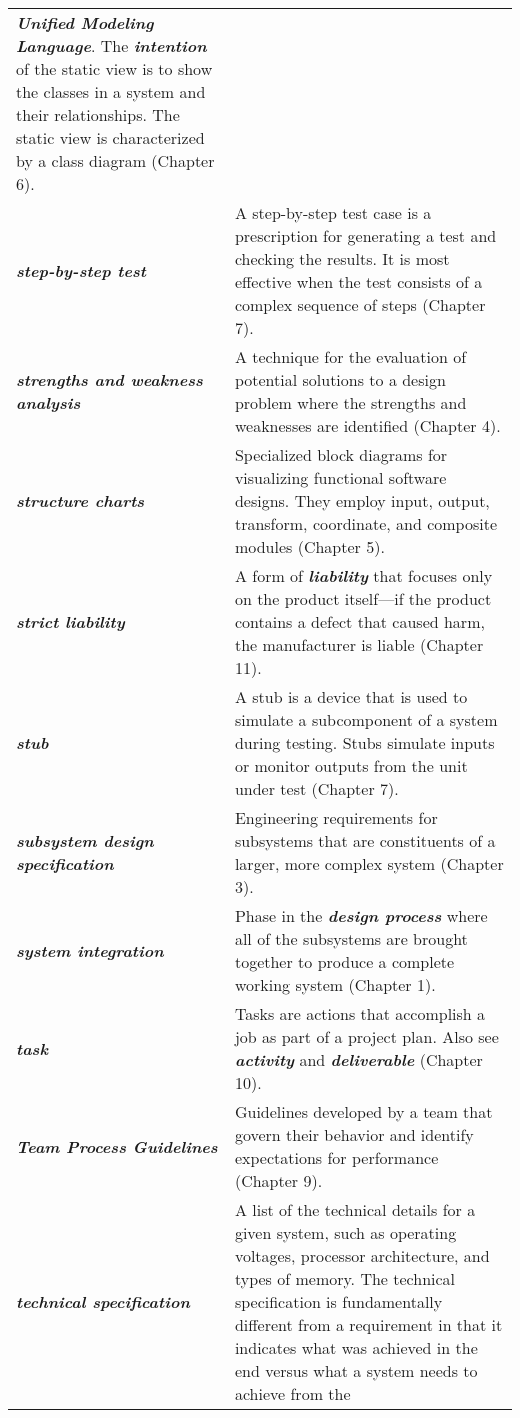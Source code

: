 \begin{longtable} { p{4cm} p{11cm}}
\emph{\textbf{Unified Modeling Language}}. The \emph{\textbf{intention}}
of the static view is to show the classes in a system and their
relationships. The static view is characterized by a class diagram
(Chapter 6). \\
\emph{\textbf{step-by-step test}} & A step-by-step test case is a
prescription for generating a test and checking the results. It is most
effective when the test consists of a complex sequence of steps (Chapter
7). \\
\emph{\textbf{strengths and weakness analysis}} & A technique for the
evaluation of potential solutions to a design problem where the
strengths and weaknesses are identified (Chapter 4). \\
\emph{\textbf{structure charts}} & Specialized block diagrams for
visualizing functional software designs. They employ input, output,
transform, coordinate, and composite modules (Chapter 5). \\
\emph{\textbf{strict liability}} & A form of \emph{\textbf{liability}}
that focuses only on the product itself---if the product contains a
defect that caused harm, the manufacturer is liable (Chapter 11). \\
\emph{\textbf{stub}} & A stub is a device that is used to simulate a
subcomponent of a system during testing. Stubs simulate inputs or
monitor outputs from the unit under test (Chapter 7). \\
\emph{\textbf{subsystem design specification}} & Engineering
requirements for subsystems that are constituents of a larger, more
complex system (Chapter 3). \\
\emph{\textbf{system integration}} & Phase in the \emph{\textbf{design
process}} where all of the subsystems are brought together to produce a
complete working system (Chapter 1). \\
\emph{\textbf{task}} & Tasks are actions that accomplish a job as part
of a project plan. Also see \emph{\textbf{activity}} and
\emph{\textbf{deliverable}} (Chapter 10). \\
\emph{\textbf{Team Process Guidelines}} & Guidelines developed by a team
that govern their behavior and identify expectations for performance
(Chapter 9). \\
\emph{\textbf{technical specification}} & A list of the technical
details for a given system, such as operating voltages, processor
architecture, and types of memory. The technical specification is
fundamentally different from a requirement in that it indicates what was
achieved in the end versus what a system needs to achieve from the

\end{longtable}
